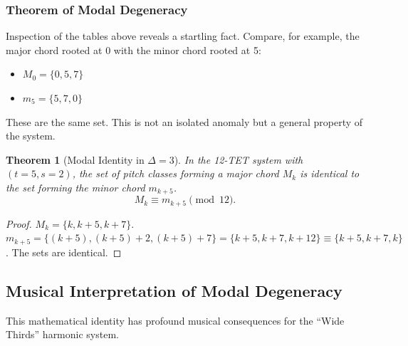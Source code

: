 \documentclass[12pt,letterpaper]{amsart}
\newtheorem{theorem}{Theorem}
\begin{document}
\subsubsection{Theorem of Modal Degeneracy}
Inspection of the tables above reveals a startling fact. Compare, for example, the major chord rooted at 0 with the minor chord rooted at 5:
\begin{itemize}
    \item $M_0 = \{0, 5, 7\}$
    \item $m_5 = \{5, 7, 0\}$
\end{itemize}
These are the same set. This is not an isolated anomaly but a general property of the system.

\begin{theorem}[Modal Identity in $\Delta=3$]
In the 12-TET system with $(t=5, s=2)$, the set of pitch classes forming a major chord $M_k$ is identical to the set forming the minor chord $m_{k+5}$.
\[ M_k \equiv m_{k+5} \pmod{12}. \]
\end{theorem}

\begin{proof}
$M_k = \{k, k+5, k+7\}$.
$m_{k+5} = \{(k+5), (k+5)+2, (k+5)+7\} = \{k+5, k+7, k+12\} \equiv \{k+5, k+7, k\}$.
The sets are identical.
\end{proof}

\subsection{Musical Interpretation of Modal Degeneracy}

This mathematical identity has profound musical consequences for the ``Wide Thirds'' harmonic system.
\end{document}
